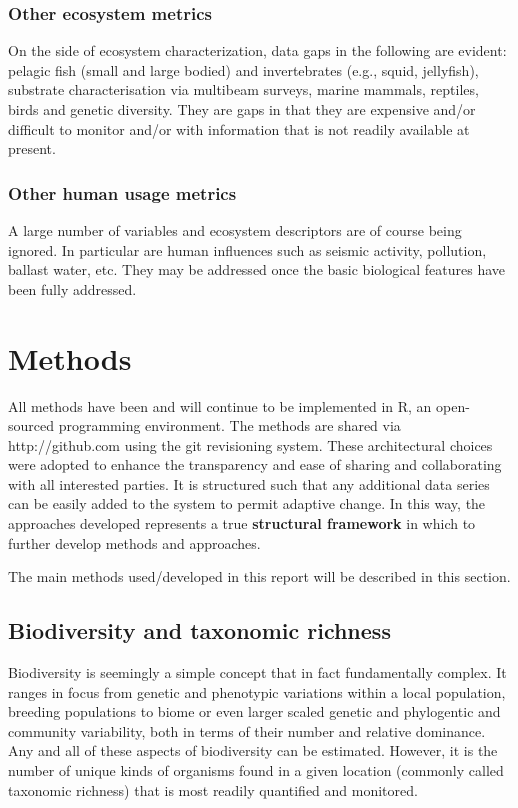 \documentclass[letterpaper,portrait,11pt]{scrartcl}
\numberwithin{equation}{section}		%
\numberwithin{figure}{section}		%
\numberwithin{table}{section}				%
\begin{document}
\subsubsection{Other ecosystem metrics}
On the side of ecosystem characterization, data gaps in the following are evident: pelagic fish (small and large bodied) and invertebrates (e.g., squid, jellyfish), substrate characterisation via multibeam surveys, marine mammals, reptiles, birds and genetic diversity. They are gaps in that they are expensive and/or difficult to monitor and/or with information that is not readily available at present.

\subsubsection{Other human usage metrics}
A large number of variables and ecosystem descriptors are of course being ignored. In particular are human influences such as seismic activity, pollution, ballast water, etc. They may be addressed once the basic biological features have been fully addressed. 


\section{Methods}

All methods have been and will continue to be implemented in R, an open-sourced programming environment. The methods are shared via http://github.com using the git revisioning system. These architectural choices were adopted to enhance the transparency and ease of sharing and collaborating with all interested parties. It is structured such that any additional data series can be easily added to the system to permit adaptive change. In this way, the approaches developed represents a true \textbf{structural framework} in which to further develop methods and approaches. 

The main methods used/developed in this report will be described in this section.


\subsection{Biodiversity and taxonomic richness}


Biodiversity is seemingly a simple concept that in fact fundamentally complex. It ranges in focus from genetic and phenotypic variations within a local population, breeding populations to biome or even larger scaled genetic and phylogentic and community variability, both in terms of their number and relative dominance. Any and all of these aspects of biodiversity can be estimated. However, it is the number of unique kinds of organisms found in a given location (commonly called taxonomic richness) that is most readily quantified and monitored. 
\end{document}
